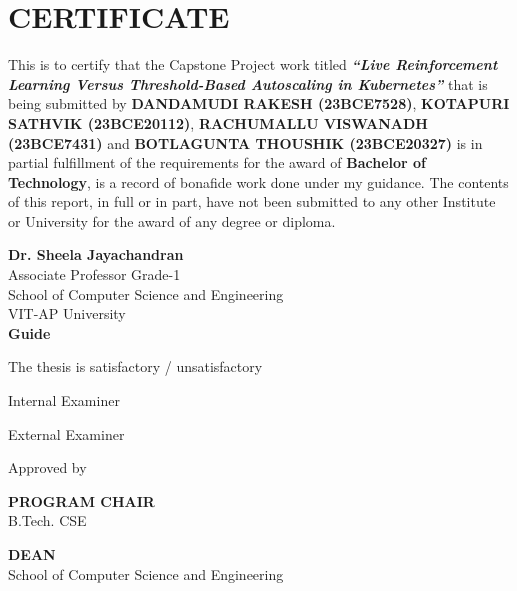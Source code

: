 \chapter*{\centering CERTIFICATE}
\label{ch:certificate}

This is to certify that the Capstone Project work titled
\textbf{\textit{``Live Reinforcement Learning Versus Threshold-Based Autoscaling in Kubernetes''}}
that is being submitted by \textbf{DANDAMUDI RAKESH (23BCE7528)},
\textbf{KOTAPURI SATHVIK (23BCE20112)}, \textbf{RACHUMALLU VISWANADH (23BCE7431)}
and \textbf{BOTLAGUNTA THOUSHIK (23BCE20327)} is in partial fulfillment of the
requirements for the award of \textbf{Bachelor of Technology}, is a record of
bonafide work done under my guidance. The contents of this report, in full or
in part, have not been submitted to any other Institute or University for the
award of any degree or diploma.

\vspace{2.0cm}

\begin{flushright}
\textbf{Dr. Sheela Jayachandran} \\
Associate Professor Grade-1 \\
School of Computer Science and Engineering \\
VIT-AP University \\
\textbf{Guide}
\end{flushright}

\vspace{1.5cm}

\begin{center}
The thesis is satisfactory / unsatisfactory
\end{center}

\vspace{1.2cm}

\noindent
\begin{minipage}[t]{0.45\textwidth}
\centering
Internal Examiner
\end{minipage}
\hfill
\begin{minipage}[t]{0.45\textwidth}
\centering
External Examiner
\end{minipage}

\vspace{1.5cm}

\begin{center}
Approved by
\end{center}

\vspace{1.0cm}

\noindent
\begin{minipage}[t]{0.45\textwidth}
\centering
\textbf{PROGRAM CHAIR} \\
B.Tech. CSE
\end{minipage}
\hfill
\begin{minipage}[t]{0.45\textwidth}
\centering
\textbf{DEAN} \\
School of Computer Science and Engineering
\end{minipage}
